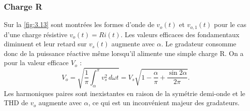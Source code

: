 			\subsubsection{Charge R}
				Sur la \autoref{fig:3.13} sont montrées les formes d'onde de $v_o(t)$ et $v_{o,1}(t)$ pour le cas d'une charge résistive $v_o(t) = Ri(t)$. Les valeurs efficaces des fondamentaux diminuent et leur retard sur $v_s(t)$ augmente avec $\alpha$. Le gradateur consomme donc de la puissance réactive même lorsqu'il alimente une simple charge R. On a pour la valeur efficace $V_o$ :
				\begin{equation}
					V_o = \sqrt{\frac{1}{\pi}\int _\alpha ^\pi v_s^2 \, d\omega t} = V_s \sqrt{1- \frac{\alpha}{\pi} + \frac{\sin 2\alpha}{2\pi}}. 
				\end{equation}
				Les harmoniques paires sont inexistantes en raison de la symétrie demi-onde et le THD de $v_o$ augmente avec $\alpha$, ce qui est un inconvénient majeur des gradateurs. 
	
